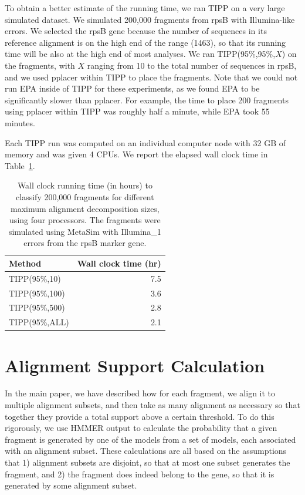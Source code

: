 To obtain a better estimate of the running time, we ran TIPP on a very large simulated dataset.  We simulated 200,000 fragments from rpsB with Illumina-like errors.  
We selected the rpsB gene because the number of
sequences in its reference alignment
is on the high end of the
range (1463), so that its running time  will
be also at the high end of most
analyses.   We ran TIPP(95\%,95\%,$X$) on the fragments, with $X$ ranging from 10 to the total number of sequences in rpsB, and
we used pplacer within TIPP to place the fragments.  
Note that we could not run EPA inside of TIPP for these experiments,
as we  found EPA to be significantly slower than pplacer.  
For example, 
the time to place 200 fragments using pplacer within TIPP was roughly 
half a minute,  while EPA took 55 minutes.

Each TIPP run was computed on an individual computer node with 32 GB of memory and was given 4 CPUs.  We report the elapsed wall clock time in Table~\ref{tipp:running_time}.  

\begin{table}[h]
\caption[Running time experiment.]{\label{tipp:running_time}Wall clock running time (in hours) to classify 
200,000 fragments for different maximum alignment decomposition sizes, using
four processors.
The fragments were simulated using MetaSim with Illumina\_1 errors from the rpsB marker gene.}
\begin{center}
\begin{tabular}{|l|r|}
\hline
Method &  Wall clock time (hr)\\
\hline
TIPP(95\%,10) & 7.5\\
TIPP(95\%,100) & 3.6\\
TIPP(95\%,500) & 2.8\\
TIPP(95\%,ALL) & 2.1\\
\hline
\end{tabular}
\end{center}

\end{table}

\newpage
\section{Alignment Support Calculation}\label{tipp:bitscores}
In the main paper, we have described how for each fragment, we align it to multiple
alignment subsets, and then take as many alignment as necessary so that 
together they provide a total support above a certain threshold.
To do this rigorously, we use HMMER output to calculate the probability
that a given fragment is generated by one of the models from 
a set of models, each associated with an alignment subset.
These calculations are all based on the assumptions that 1) alignment subsets are
disjoint, so that at most one subset generates the fragment, and 2)
the fragment does indeed belong to the gene, so that it is generated by some
alignment subset. 

